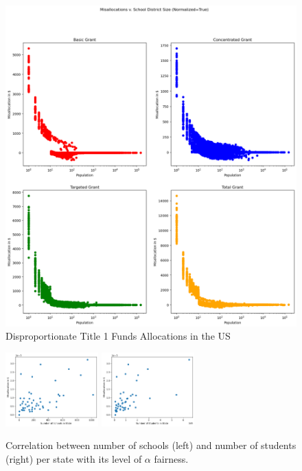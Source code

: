 \documentclass[9pt,twocolumn,twoside,lineno]{pnas-new}
\begin{document}
\begin{figure}[h]
\centering
\includegraphics[width=0.7\linewidth]{images/all_grant_errors_normalized_vs_pop.png}
\caption{Disproportionate Title 1 Funds Allocations in the US}
\label{fig:missallocs_total}
\end{figure}


\begin{figure}[!ht]
    \centering
    \includegraphics[width=0.48\linewidth, height=80pt]{images/af_vs_num_schools_per_state.png}
    \includegraphics[width=0.48\linewidth, height=80pt]{images/af_vs_num_students_per_state.png}
    \caption{Correlation between number of schools (left) and number of students (right) per state with its level of $\alpha$ fairness. }
    \label{fig:corr_fair_num_schools}
    \label{fig:corr_fair_num_students}
\end{figure}
\end{document}
